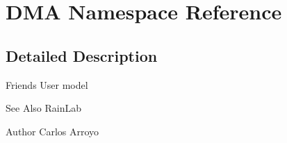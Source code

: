 \hypertarget{namespaceDMA}{\section{D\-M\-A Namespace Reference}
\label{namespaceDMA}
}


\subsection{Detailed Description}
Friends User model  \begin{DoxySeeAlso}{See Also}
Rain\-Lab 
\end{DoxySeeAlso}
\begin{DoxyAuthor}{Author}
Carlos Arroyo 
\end{DoxyAuthor}
